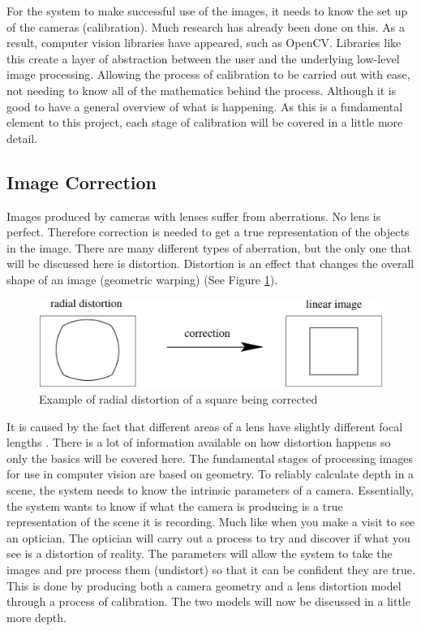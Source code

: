 \documentclass[11pt,oneside]{report}
\begin{document}
			For the system to make successful use of the images, it needs to know the set up of the cameras (calibration).
			Much research has already been done on this.
			As a result, computer vision libraries have appeared, such as OpenCV.
			Libraries like this create a layer of abstraction between the user and the underlying low-level image processing.
			Allowing the process of calibration to be carried out with ease, not needing to know all of the mathematics behind the process.
			Although it is good to have a general overview of what is happening.
			As this is a fundamental element to this project, each stage of calibration will be covered in a little more detail.
				\subsection{Image Correction}
				Images produced by cameras with lenses suffer from aberrations.
				No lens is perfect.
				Therefore correction is needed to get a true representation of the objects in the image.
				There are many different types of aberration, but the only one that will be discussed here is distortion.
				Distortion is an effect that changes the overall shape of an image (geometric warping) (See Figure \ref{fig:distortion}).
				\begin{figure}[!h]
				\begin{center}
					
    					\includegraphics[width=\textwidth]{distortion_1}
    					\caption{Example of radial distortion of a square being corrected \protect\cite{book:multiViewGeo} {\label{fig:distortion}}}
    				\end{center}
				\end{figure}				
				It is caused by the fact that different areas of a lens have slightly different focal lengths \cite[p. 42]{book:modern}.
				There is a lot of information available on how distortion happens so only the basics will be covered here. %
				The fundamental stages of processing images for use in computer vision are based on geometry.
				To reliably calculate depth in a scene, the system needs to know the intrinsic %
				parameters of a camera.
				Essentially, the system wants to know if what the camera is producing is a true representation of the scene it is recording.
				Much like when you make a visit to see an optician. 
				The optician will carry out a process to try and discover if what you see is a distortion of reality.
				The parameters will allow the system to take the images and pre process them (undistort) so that it can be confident they are true.
				This is done by producing both a camera geometry and a lens distortion model through a process of calibration.  
				The two models will now be discussed in a little more depth.				
\end{document}
